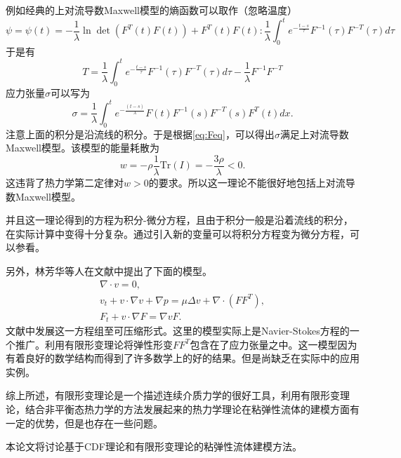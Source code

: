 \documentclass{article}
\begin{document}
例如经典的上对流导数Maxwell模型的熵函数可以取作（忽略温度）
\begin{equation*}
	\psi  = \psi(t) = - \frac{1}{\lambda}  \ln \det (F^T(t) F(t)) + F^T(t) F(t) : \frac{1}{\lambda}  \int_{0}^t e^{-\frac{t-s}{\tau}} F^{-1}(\tau) F^{-T}(\tau) d\tau 
\end{equation*}
于是有
\begin{equation*}
	T = \frac{1}{\lambda}  \int_{0}^t e^{-\frac{t-s}{\tau}} F^{-1}(\tau) F^{-T}(\tau) d\tau -\frac{1}{\lambda}  F^{-1} F^{-T} 
\end{equation*}
应力张量$\sigma$可以写为
\begin{equation*}
	\sigma = \frac{1}{\lambda} \int_{0}^{t} e^{-\frac{(t-s)}{\lambda} } F(t)  F^{-1}(s) F^{-T}(s) F^T(t)  dx.
\end{equation*}
注意上面的积分是沿流线的积分。于是根据\eqref{eq:Feq}，可以得出$\sigma$满足上对流导数Maxwell模型。该模型的能量耗散为
\begin{equation*}
	w = - \rho \frac{1}{\lambda} \mbox{Tr}(I) = -\frac{3\rho}{\lambda} < 0.
\end{equation*}
这违背了热力学第二定律对$w>0$的要求。所以这一理论不能很好地包括上对流导数Maxwell模型。

并且这一理论得到的方程为积分-微分方程，且由于积分一般是沿着流线的积分，在实际计算中变得十分复杂。通过引入新的变量可以将积分方程变为微分方程，可以参看\cite{dimitrienko2010nonlinear}。

另外，林芳华等人在文献\cite{lin2005hydrodynamics}中提出了下面的模型。
\begin{subequations}\label{eq:linincompressible}
	\begin{align}
		\nabla \cdot v = 0, \\
		v_t + v \cdot \nabla v + \nabla p = \mu \Delta v + \nabla \cdot( F F^T), \\
		F_t + v \cdot \nabla F = \nabla v F.
	\end{align}
\end{subequations}
文献\cite{liu2008global}中发展这一方程组至可压缩形式。这里的模型实际上是Navier-Stokes方程的一个推广。利用有限形变理论将弹性形变$F F^T$包含在了应力张量之中。这一模型因为有着良好的数学结构而得到了许多数学上的好的结果\cite{lin2012some}。但是尚缺乏在实际中的应用实例。

综上所述，有限形变理论是一个描述连续介质力学的很好工具，利用有限形变理论，结合非平衡态热力学的方法发展起来的热力学理论在粘弹性流体的建模方面有一定的优势，但是也存在一些问题。

本论文将讨论基于CDF理论和有限形变理论的粘弹性流体建模方法。
\end{document}
